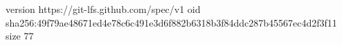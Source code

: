 version https://git-lfs.github.com/spec/v1
oid sha256:49f79ae48671ed4e78c6c491e3d6f882b6318b3f84ddc287b45567ec4d2f3f11
size 77
